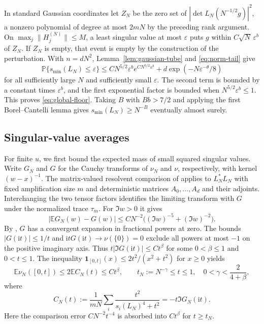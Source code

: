 In standard Gaussian coordinates let $Z_N$ be the zero set of $|\det L_N(N^{-1/2}g)|^2$, a nonzero polynomial of degree at most $2mN$ by the preceding rank argument.
On $\max_j\|H_j^{(N)}\|\le M$, a least singular value at most $\varepsilon$ puts $g$ within $C\sqrt N\,\varepsilon^b$ of $Z_N$.
If $Z_N$ is empty, that event is empty by the construction of the perturbation.
With $n=dN^2$, Lemma~\ref{lem:gaussian-tube} and \eqref{eq:norm-tail} give
\[
 \mathbb P\{s_{\min}(L_N)\le\varepsilon\}
 \le C N^{5/2}\varepsilon^b e^{C N^{5/2}\varepsilon^b}
     +d\exp(-N\varepsilon^{-\theta}/8)
\]
for all sufficiently large $N$ and sufficiently small $\varepsilon$.
The second term is bounded by a constant times $\varepsilon^b$, and the first exponential factor is bounded when $N^{5/2}\varepsilon^b\le 1$.
This proves \eqref{eq:global-floor}.
Taking $B$ with $Bb>7/2$ and applying the first Borel--Cantelli lemma gives $s_{\min}(L_N)\ge N^{-B}$ eventually almost surely.

\subsection{Singular-value averages}\label{subsec:affine-counting}

For finite $u$, we first bound the expected mass of small squared singular values.
Write $G_N$ and $G$ for the Cauchy transforms of $\nu_N$ and $\nu$, respectively, with kernel $(w-x)^{-1}$.
The matrix-valued resolvent comparison of \cite[Corollary~1.3 of arXiv v1]{CGP22} applies to $L_N^*L_N$ with fixed amplification size $m$ and deterministic matrices $A_0,\ldots,A_d$ and their adjoints.
Interchanging the two tensor factors identifies the limiting transform with $G$ under the normalized trace $\tau_m$.
For $\Im w>0$ it gives
\[
 |\mathbb E G_N(w)-G(w)|\le C N^{-2}\bigl((\Im w)^{-5}+(\Im w)^{-2}\bigr).
\]
By \cite[Theorem~1.1(5)--(6)]{SS15}, $G$ has a convergent expansion in fractional powers at zero.
The bounds $|G(\mathrm{i}t)|\le 1/t$ and $\mathrm{i}tG(\mathrm{i}t)\to\nu(\{0\})=0$ exclude all powers at most $-1$ on the positive imaginary axis.
Thus $t|\Im G(\mathrm{i}t)|\le Ct^\beta$ for some $0<\beta\le1$ and $0<t\le1$.
The inequality $\mathbf 1_{[0,t]}(x)\le 2t^2/(x^2+t^2)$ for $x\ge0$ yields
\begin{equation}\label{eq:affine-count}
 \mathbb E\nu_N([0,t])\le 2\mathbb E C_N(t)
 \le C t^\beta,\qquad
 t_N:=N^{-\gamma}\le t\le1,\quad 0<\gamma<\frac{2}{4+\beta},
\end{equation}
where
\[
 C_N(t):=\frac1{mN}\sum_i\frac{t^2}{s_i(L_N)^4+t^2}
        =-t\Im G_N(\mathrm{i}t).
\]
Here the comparison error $CN^{-2}t^{-4}$ is absorbed into $Ct^\beta$ for $t\ge t_N$.

